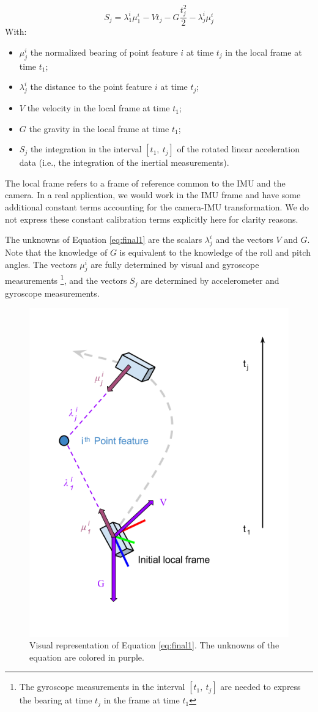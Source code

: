 \documentclass[letterpaper, 10 pt, journal, final]{ieeeconf}  %
\begin{document}
\begin{equation} \label{eq:final1}
S_j = \lambda_1^i\mu_1^i - V t_j - G \frac{t_j^2}{2} - \lambda^i_j \mu^i_j
\end{equation}
With:
\begin{itemize}
\item $\mu_j^i$ the normalized bearing of point feature $i$ at time $t_j$ in the local frame at time $t_1$;
\item $\lambda_j^i$ the distance to the point feature $i$ at time $t_j$;
\item $V$ the velocity in the local frame at time $t_1$;
\item $G$ the gravity in the local frame  at time $t_1$;
\item $S_j$ the integration in the interval $[t_1, ~t_j]$ of the rotated linear acceleration data (i.e., the integration of the inertial measurements).
\end{itemize}


The local frame refers to a frame of reference common to the IMU and the camera.
In a real application, we would work in the IMU frame and have some additional constant terms
accounting for the camera-IMU transformation.
We do not express these constant calibration terms explicitly here for clarity reasons.

The unknowns of Equation \ref{eq:final1} are the scalars $\lambda_j^i$ and the vectors $V$ and $G$.
Note that the knowledge of $G$ is equivalent to the knowledge of the roll and pitch angles.
The vectors $\mu_j^i$ are fully determined by visual and gyroscope measurements \footnote{The gyroscope measurements in the interval $[t_1, ~t_j]$ are needed to express the bearing at time $t_j$ in the frame at time $t_1$},
and the vectors $S_j$ are determined by accelerometer and gyroscope measurements.

\begin{figure}
  \centering
  \includegraphics[width=0.7\columnwidth, trim={0 2cm 0 0}, clip]{images/closedFormExplained}
  \caption{Visual representation of Equation \ref{eq:final1}.
  The unknowns of the equation are colored in \textcolor{amethyst}{purple}.}
\end{figure}
\end{document}
